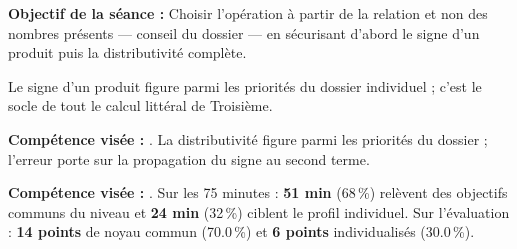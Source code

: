 \documentclass[10pt,a4paper]{article}
\begin{document}
\begin{goalbox}\textbf{Objectif de la séance :} Choisir l'opération à partir de la relation et non des nombres présents — conseil du dossier — en sécurisant d'abord le signe d'un produit puis la distributivité complète.\end{goalbox}
Le signe d'un produit figure parmi les priorités du dossier individuel ; c'est le socle de tout le calcul littéral de Troisième.
\par\vspace{1mm}\textbf{Compétence visée :} .
La distributivité figure parmi les priorités du dossier ; l'erreur porte sur la propagation du signe au second terme.
\par\vspace{1mm}\textbf{Compétence visée :} .
Sur les 75 minutes : \textbf{51 min} (68\,\%) relèvent des objectifs communs du niveau et \textbf{24 min} (32\,\%) ciblent le profil individuel. Sur l'évaluation : \textbf{14 points} de noyau commun (70.0\,\%) et \textbf{6 points} individualisés (30.0\,\%).
\newpage{}
\end{document}
